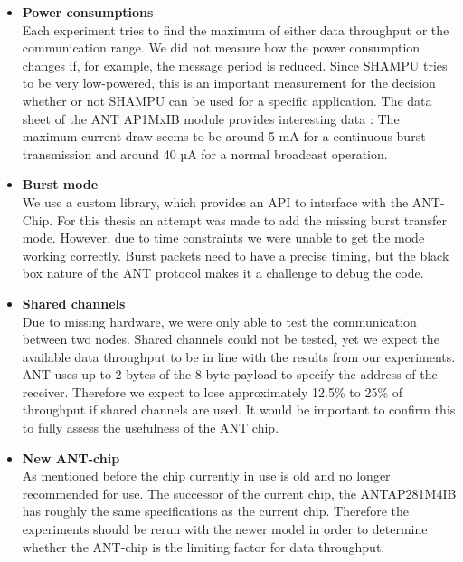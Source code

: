 \begin{itemize}
	\item{\textbf{Power consumptions}} \hfill \\ Each experiment tries to find the maximum of either data throughput or the communication range. We did not measure how the power consumption changes if, for example, the message period is reduced. Since SHAMPU tries to be very low-powered, this is an important measurement for the decision whether or not SHAMPU can be used for a specific application. The data sheet of the ANT AP1MxIB module provides interesting data \cite{Networks}: The maximum current draw seems to be around 5 mA for a continuous burst transmission and around 40 µA for a normal broadcast operation.
	
	\item{\textbf{Burst mode}} \hfill \\ We use a custom library, which provides an API to interface with the ANT-Chip. For this thesis an attempt was made to add the missing burst transfer mode. However, due to time constraints we were unable to get the mode working correctly. Burst packets need to have a precise timing, but the black box nature of the ANT protocol makes it a challenge to debug the code.
	
	\item{\textbf{Shared channels}} \hfill \\ Due to missing hardware, we were only able to test the communication between two nodes. Shared channels could not be tested, yet we expect the available data throughput to be in line with the results from our experiments. ANT uses up to 2 bytes of the 8 byte payload to specify the address of the receiver. Therefore we expect to lose approximately 12.5\% to 25\% of throughput if shared channels are used. It would be important to confirm this to fully assess the usefulness of the ANT chip.
	
	\item{\textbf{New ANT-chip}} \hfill \\ As mentioned before the chip currently in use is old and no longer recommended for use. The successor of the current chip, the ANTAP281M4IB has roughly the same specifications as the current chip. Therefore the experiments should be rerun with the newer model in order to determine whether the ANT-chip is the limiting factor for data throughput.
\end{itemize}